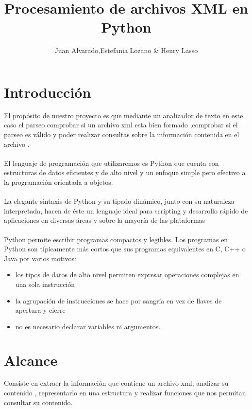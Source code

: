 \documentclass[11pt]{article} %
\title{Procesamiento de archivos  XML  en Python}
\author{Juan Alvarado,Estefania Lozano \&  Henry Lasso}
\begin{document}
\maketitle

\section{Introducción}
El propósito de nuestro proyecto es que  mediante un analizador de texto en este caso el parseo comprobar si un archivo xml esta bien formado ,comprobar si el parseo es válido y poder realizar consultas sobre la información contenida en el archivo .\\ \\
El lenguaje de programación que utilizaremos es Python que cuenta con estructuras de datos eficientes y de alto
nivel y un enfoque simple pero efectivo a la programación orientada a objetos.\\ \\
La elegante sintaxis de Python y su tipado dinámico, junto con su naturaleza interpretada, hacen de éste un lenguaje ideal para scripting y desarrollo rápido de aplicaciones en diversas áreas y sobre la mayoría de las plataformas\\ \\
Python permite escribir programas compactos y legibles. Los programas en Python son típicamente más cortos que sus
programas equivalentes en C, C++ o Java por varios motivos:
\begin{itemize}
\item los tipos de datos de alto nivel permiten expresar operaciones complejas en una sola instrucción
\item la agrupación de instrucciones se hace por sangría en vez de llaves de apertura y cierre
\item  no es necesario declarar variables ni argumentos.
\end{itemize}

\section{Alcance}
Consiste en extraer la información que contiene un archivo xml, analizar su contenido , representarlo en una estructura y realizar funciones que nos permitan consultar su contenido.
\end{document}
